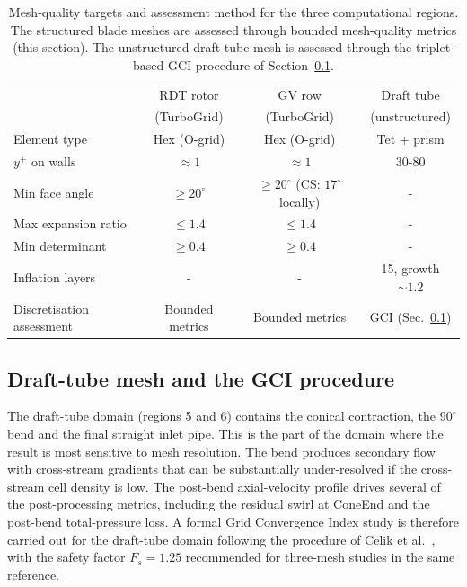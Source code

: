 \begin{table}[h!]
\centering
\caption[Mesh-quality summary across the three computational regions]{Mesh-quality targets and assessment method for the three computational regions. The structured blade meshes are assessed through bounded mesh-quality metrics (this section). The unstructured draft-tube mesh is assessed through the triplet-based GCI procedure of Section~\ref{sec:gci_drafttube}.}
\label{tab:mesh_quality}
\small
\begin{tabular}{l c c c}
\toprule
                            & RDT rotor       & GV row                                   & Draft tube \\
                            & (TurboGrid)     & (TurboGrid)                              & (unstructured) \\
\midrule
Element type                & Hex (O-grid)    & Hex (O-grid)                             & Tet + prism \\
$y^+$ on walls              & $\approx 1$    & $\approx 1$                              & $30$-$80$ \\
Min face angle              & $\geq 20^\circ$ & $\geq 20^\circ$ (CS: $17^\circ$ locally) & - \\
Max expansion ratio         & $\leq 1.4$     & $\leq 1.4$                               & - \\
Min determinant             & $\geq 0.4$     & $\geq 0.4$                               & - \\
Inflation layers            & -             & -                                      & 15, growth $\sim 1.2$ \\
Discretisation assessment   & Bounded metrics & Bounded metrics                          & GCI (Sec.~\ref{sec:gci_drafttube}) \\
\bottomrule
\end{tabular}
\end{table}

\subsection{Draft-tube mesh and the GCI procedure}
\label{sec:gci_drafttube}

The draft-tube domain (regions 5 and 6) contains the conical contraction, the $90^\circ$ bend and the final straight inlet pipe. This is the part of the domain where the result is most sensitive to mesh resolution. The bend produces secondary flow with cross-stream gradients that can be substantially under-resolved if the cross-stream cell density is low. The post-bend axial-velocity profile drives several of the post-processing metrics, including the residual swirl at ConeEnd and the post-bend total-pressure loss. A formal Grid Convergence Index study is therefore carried out for the draft-tube domain following the procedure of Celik et al.~\cite{Celik2008}, with the safety factor $F_s = 1.25$ recommended for three-mesh studies in the same reference.

